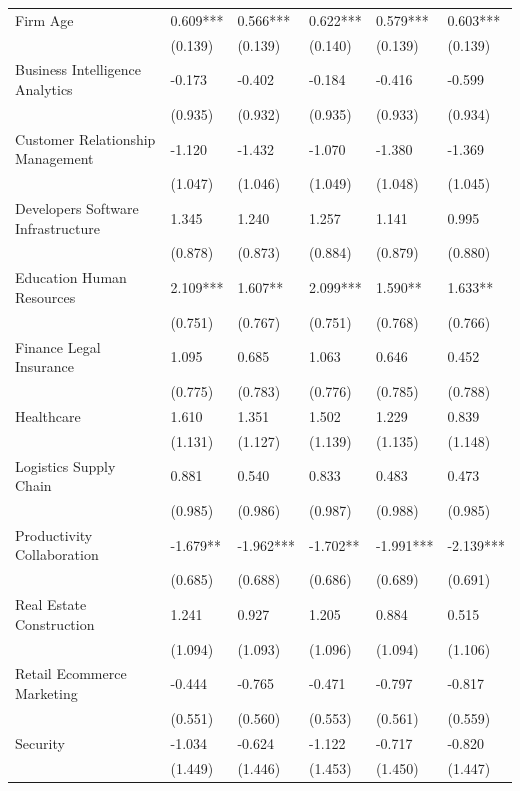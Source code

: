 \documentclass[12pt]{article}
\begin{document}
\begin{table}[!ht]
\begin{tabular}{llllll}
        Firm Age & 0.609*** & 0.566*** & 0.622*** & 0.579*** & 0.603*** \\
        ~ & (0.139) & (0.139) & (0.140) & (0.139) & (0.139) \\
        Business Intelligence Analytics & -0.173 & -0.402 & -0.184 & -0.416 & -0.599 \\
        ~ & (0.935) & (0.932) & (0.935) & (0.933) & (0.934) \\
        Customer Relationship Management & -1.120 & -1.432 & -1.070 & -1.380 & -1.369 \\
        ~ & (1.047) & (1.046) & (1.049) & (1.048) & (1.045) \\
        Developers Software Infrastructure & 1.345 & 1.240 & 1.257 & 1.141 & 0.995 \\
        ~ & (0.878) & (0.873) & (0.884) & (0.879) & (0.880) \\
        Education Human Resources & 2.109*** & 1.607** & 2.099*** & 1.590** & 1.633** \\
        ~ & (0.751) & (0.767) & (0.751) & (0.768) & (0.766) \\
        Finance Legal Insurance & 1.095 & 0.685 & 1.063 & 0.646 & 0.452 \\
        ~ & (0.775) & (0.783) & (0.776) & (0.785) & (0.788) \\
        Healthcare & 1.610 & 1.351 & 1.502 & 1.229 & 0.839 \\
        ~ & (1.131) & (1.127) & (1.139) & (1.135) & (1.148) \\
        Logistics Supply Chain & 0.881 & 0.540 & 0.833 & 0.483 & 0.473 \\
        ~ & (0.985) & (0.986) & (0.987) & (0.988) & (0.985) \\
        Productivity Collaboration & -1.679** & -1.962*** & -1.702** & -1.991*** & -2.139*** \\
        ~ & (0.685) & (0.688) & (0.686) & (0.689) & (0.691) \\
        Real Estate Construction & 1.241 & 0.927 & 1.205 & 0.884 & 0.515 \\
        ~ & (1.094) & (1.093) & (1.096) & (1.094) & (1.106) \\
        Retail Ecommerce Marketing & -0.444 & -0.765 & -0.471 & -0.797 & -0.817 \\
        ~ & (0.551) & (0.560) & (0.553) & (0.561) & (0.559) \\
        Security & -1.034 & -0.624 & -1.122 & -0.717 & -0.820 \\
        ~ & (1.449) & (1.446) & (1.453) & (1.450) & (1.447) \\

\end{tabular}
\end{table}
\end{document}
